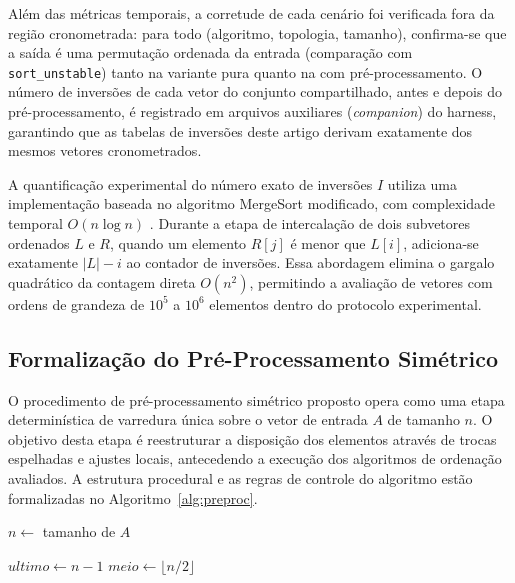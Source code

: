\documentclass[portuguese]{sbc2025}%
\begin{document}
Além das métricas temporais, a corretude de cada cenário foi verificada fora da região cronometrada: para todo (algoritmo, topologia, tamanho), confirma-se que a saída é uma permutação ordenada da entrada (comparação com \texttt{sort\_unstable}) tanto na variante pura quanto na com pré-processamento. O número de inversões de cada vetor do conjunto compartilhado, antes e depois do pré-processamento, é registrado em arquivos auxiliares (\emph{companion}) do harness, garantindo que as tabelas de inversões deste artigo derivam exatamente dos mesmos vetores cronometrados.

A quantificação experimental do número exato de inversões $I$ utiliza uma implementação baseada no algoritmo MergeSort modificado, com complexidade temporal $O(n \log n)$ \citep{cormen_introduction_2022}. Durante a etapa de intercalação de dois subvetores ordenados $L$ e $R$, quando um elemento $R[j]$ é menor que $L[i]$, adiciona-se exatamente $|L| - i$ ao contador de inversões. Essa abordagem elimina o gargalo quadrático da contagem direta $O(n^2)$, permitindo a avaliação de vetores com ordens de grandeza de $10^5$ a $10^6$ elementos dentro do protocolo experimental.

\subsection{Formalização do Pré-Processamento Simétrico}

O procedimento de pré-processamento simétrico proposto opera como uma etapa determinística de varredura única sobre o vetor de entrada $A$ de tamanho $n$. O objetivo desta etapa é reestruturar a disposição dos elementos através de trocas espelhadas e ajustes locais, antecedendo a execução dos algoritmos de ordenação avaliados. A estrutura procedural e as regras de controle do algoritmo estão formalizadas no Algoritmo~\ref{alg:preproc}.

\begin{algorithm}[htbp]
\caption{Algoritmo de Pré-Processamento Simétrico}
\label{alg:preproc}

\SetAlgoLined


$n \gets$ tamanho de $A$\;


$ultimo \gets n - 1$\;
$meio \gets \lfloor n/2 \rfloor$\;


\end{algorithm}
\end{document}
